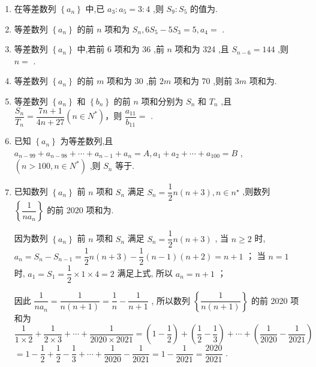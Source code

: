


\begin{enumerate}
    \item 在等差数列 $\left\{  {a}_{n}\right\}$ 中,已 ${a}_{3} : {a}_{5} = 3 : 4$ ,则 ${S}_{9} : {S}_{5}$ 的值为.
    
    \item 等差数列 $\left\{  {a}_{n}\right\}$ 的前 $n$ 项和为 ${S}_{n},6{S}_{5} - 5{S}_{3} = 5,{a}_{4} =$ .

    \item 等差数列 $\left\{  {a}_{n}\right\}$ 中,若前 6 项和为 36 ,前 $n$ 项和为 324 ,且 ${S}_{n - 6} = {144}$ ,则 $n =$ .

    \item 等差数列 $\left\{  {a}_{n}\right\}$ 的前 $m$ 项和为 30 ,前 ${2m}$ 项和为 70 ,则前 ${3m}$ 项和为.

    
    \item 等差数列 $\left\{  {a}_{n}\right\}$ 和 $\left\{  {b}_{n}\right\}$ 的前 $n$ 项和分别为 ${S}_{n}$ 和 ${T}_{n}$ ,且 $\dfrac{{S}_{n}}{{T}_{n}} = \dfrac{{7n} + 1}{{4n} + {27}}\left( {n \in  {N}^{ * }}\right)$，则 $\dfrac{{a}_{11}}{{b}_{11}} =$ .

    \item 已知 $\left\{  {a}_{n}\right\}$ 为等差数列,且 ${a}_{n - {99}} + {a}_{n - {98}} + \cdots  + {a}_{n - 1} + {a}_{n} = A,{a}_{1} + {a}_{2} + \cdots  + {a}_{100} = B$ , $\left( {n > {100},n \in  {N}^{ * }}\right)$ ,则 ${S}_{n}$ 等于.

    \item 已知数列 $\left\{  {a}_{n}\right\}$ 前 $n$ 项和 ${S}_{n}$ 满足 ${S}_{n} = \dfrac{1}{2}n\left( {n + 3}\right) ,n \in  {n}^{ \star  }$ ,则数列 $\left\{  \dfrac{1}{n{a}_{n}}\right\}$ 的前 2020 项和为.
    \begin{jieda}
        因为数列 $\left\{  {a}_{n}\right\}$ 前 $n$ 项和 ${S}_{n}$ 满足 ${S}_{n} = \dfrac{1}{2}n\left( {n + 3}\right)$ ,
        当 $n \geq  2$ 时, ${a}_{n} = {S}_{n} - {S}_{n - 1} = \dfrac{1}{2}n\left( {n + 3}\right)  - \dfrac{1}{2}\left( {n - 1}\right) \left( {n + 2}\right)  = n + 1$ ；
        当 $n = 1$ 时, ${a}_{1} = {S}_{1} = \dfrac{1}{2} \times  1 \times  4 = 2$ 满足上式,
        所以 ${a}_{n} = n + 1$ ；
        
        因此 $\dfrac{1}{n{a}_{n}} = \dfrac{1}{n\left( {n + 1}\right) } = \dfrac{1}{n} - \dfrac{1}{n + 1}$ ,
        所以数列 $\left\{  \dfrac{1}{n\left( {n + 1}\right) }\right\}$ 的前 2020 项和为
        $\dfrac{1}{1 \times  2} + \dfrac{1}{2 \times  3} + \cdots  + \dfrac{1}{{2020} \times  {2021}} = \left( {1 - \dfrac{1}{2}}\right)  + \left( {\dfrac{1}{2} - \dfrac{1}{3}}\right)  + \cdots  + \left( {\dfrac{1}{2020} - \dfrac{1}{2021}}\right)$
        $= 1 - \dfrac{1}{2} + \dfrac{1}{2} - \dfrac{1}{3} + \cdots  + \dfrac{1}{2020} - \dfrac{1}{2021} = 1 - \dfrac{1}{2021} = \dfrac{2020}{2021}$ .
        

\end{jieda}
\end{enumerate}
